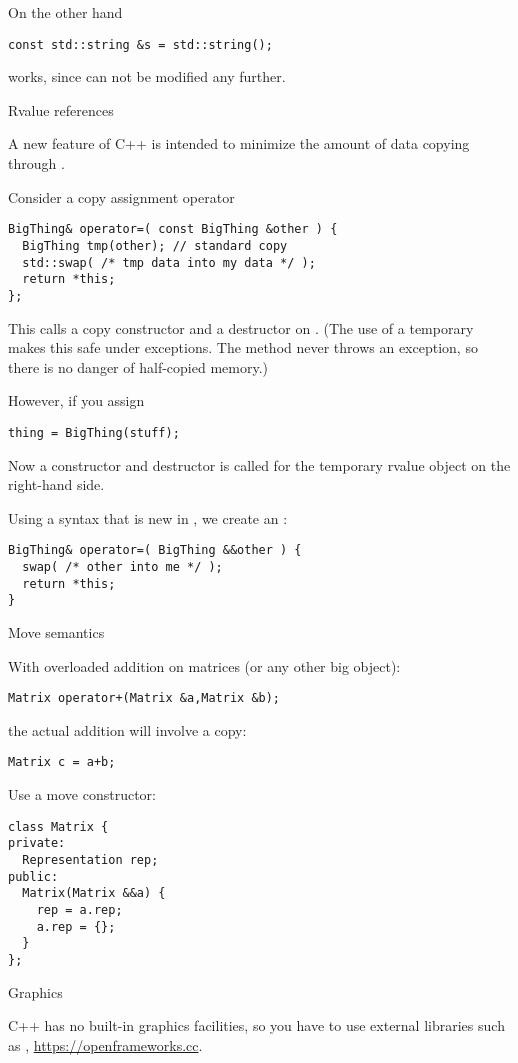 On the other hand
\begin{verbatim}
const std::string &s = std::string();
\end{verbatim}
works, since  can not be modified any further.

 {Rvalue references}
\label{sec:rvalue-ref}

A new feature of C++ is
intended to minimize the amount of data copying through
.

Consider a copy assignment operator
\begin{verbatim}
BigThing& operator=( const BigThing &other ) {
  BigThing tmp(other); // standard copy
  std::swap( /* tmp data into my data */ );
  return *this;
};
\end{verbatim}
This calls a copy constructor and a destructor on . (The use of
a temporary makes this safe under exceptions. The 
method never throws an exception, so there is no danger of half-copied
memory.)

However, if you assign
\begin{verbatim}
thing = BigThing(stuff);
\end{verbatim}
Now a constructor and destructor is called for the temporary rvalue object on
the right-hand side.

Using a syntax that is new in , we create an
:
\begin{verbatim}
BigThing& operator=( BigThing &&other ) {
  swap( /* other into me */ );
  return *this;
}
\end{verbatim}

 {Move semantics}

With overloaded addition on matrices (or any other big object):
\begin{lstlisting}
Matrix operator+(Matrix &a,Matrix &b);
\end{lstlisting}
the actual addition will involve a copy:
\begin{lstlisting}
Matrix c = a+b;
\end{lstlisting}

Use a move constructor:
\begin{lstlisting}
class Matrix {
private:
  Representation rep;
public:
  Matrix(Matrix &&a) {
    rep = a.rep;
    a.rep = {};
  }
};
\end{lstlisting}

 {Graphics}

C++ has no built-in graphics facilities, so you have to use external
libraries such as ,
\url{https://openframeworks.cc}.
